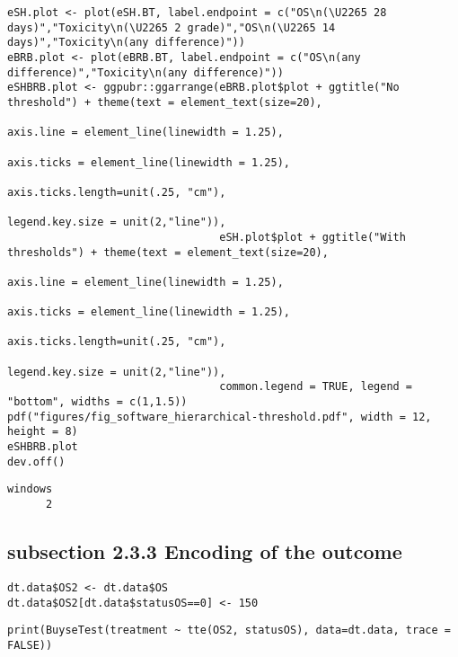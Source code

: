 \documentclass[12pt]{article}
\begin{document}
\lstset{language=r,label= ,caption= ,captionpos=b,numbers=none}
\begin{lstlisting}
eSH.plot <- plot(eSH.BT, label.endpoint = c("OS\n(\U2265 28 days)","Toxicity\n(\U2265 2 grade)","OS\n(\U2265 14 days)","Toxicity\n(any difference)"))
eBRB.plot <- plot(eBRB.BT, label.endpoint = c("OS\n(any difference)","Toxicity\n(any difference)")) 
eSHBRB.plot <- ggpubr::ggarrange(eBRB.plot$plot + ggtitle("No threshold") + theme(text = element_text(size=20), 
                                                                                  axis.line = element_line(linewidth = 1.25),
                                                                                  axis.ticks = element_line(linewidth = 1.25),
                                                                                  axis.ticks.length=unit(.25, "cm"),
                                                                                  legend.key.size = unit(2,"line")),
                                 eSH.plot$plot + ggtitle("With thresholds") + theme(text = element_text(size=20), 
                                                                                    axis.line = element_line(linewidth = 1.25),
                                                                                    axis.ticks = element_line(linewidth = 1.25),
                                                                                    axis.ticks.length=unit(.25, "cm"),
                                                                                    legend.key.size = unit(2,"line")),
                                 common.legend = TRUE, legend = "bottom", widths = c(1,1.5))
pdf("figures/fig_software_hierarchical-threshold.pdf", width = 12, height = 8)
eSHBRB.plot
dev.off()
\end{lstlisting}

\begin{verbatim}
windows 
      2
\end{verbatim}

\subsection{subsection 2.3.3 Encoding of the outcome}
\label{sec:org71085fe}
\lstset{language=r,label= ,caption= ,captionpos=b,numbers=none}
\begin{lstlisting}
dt.data$OS2 <- dt.data$OS
dt.data$OS2[dt.data$statusOS==0] <- 150
\end{lstlisting}

\lstset{language=r,label= ,caption= ,captionpos=b,numbers=none}
\begin{lstlisting}
print(BuyseTest(treatment ~ tte(OS2, statusOS), data=dt.data, trace = FALSE))
\end{lstlisting}
\end{document}
